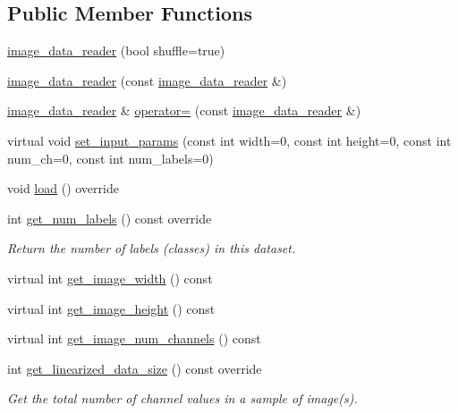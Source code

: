 \subsection*{Public Member Functions}
\begin{DoxyCompactItemize}
\item 
\hyperlink{classlbann_1_1image__data__reader_a582185ab03c4643117fd93e0ba843882}{image\+\_\+data\+\_\+reader} (bool shuffle=true)
\item 
\hyperlink{classlbann_1_1image__data__reader_a7a5dd69d535f2966e4f8da53f505ca7c}{image\+\_\+data\+\_\+reader} (const \hyperlink{classlbann_1_1image__data__reader}{image\+\_\+data\+\_\+reader} \&)
\item 
\hyperlink{classlbann_1_1image__data__reader}{image\+\_\+data\+\_\+reader} \& \hyperlink{classlbann_1_1image__data__reader_a76a0b52eafb9ad133fb45fec7cf44700}{operator=} (const \hyperlink{classlbann_1_1image__data__reader}{image\+\_\+data\+\_\+reader} \&)
\item 
virtual void \hyperlink{classlbann_1_1image__data__reader_a6ed9b8b12ad3ffa93ad458d872f8c044}{set\+\_\+input\+\_\+params} (const int width=0, const int height=0, const int num\+\_\+ch=0, const int num\+\_\+labels=0)
\item 
void \hyperlink{classlbann_1_1image__data__reader_a99cb80242d7d20bc1e8baeaff25ff790}{load} () override
\item 
int \hyperlink{classlbann_1_1image__data__reader_af821795e5104f1a8c34027de96af7b90}{get\+\_\+num\+\_\+labels} () const override
\begin{DoxyCompactList}\small\item\em Return the number of labels (classes) in this dataset. \end{DoxyCompactList}\item 
virtual int \hyperlink{classlbann_1_1image__data__reader_a2e75d4ec8f222f4f855e6c0162648dc7}{get\+\_\+image\+\_\+width} () const
\item 
virtual int \hyperlink{classlbann_1_1image__data__reader_a641364038b54fe8291f23f9d879293e3}{get\+\_\+image\+\_\+height} () const
\item 
virtual int \hyperlink{classlbann_1_1image__data__reader_a3699aa92d3ef2ccc0c30ecf27809acbe}{get\+\_\+image\+\_\+num\+\_\+channels} () const
\item 
int \hyperlink{classlbann_1_1image__data__reader_a26b8566e76ba99c017a84c49a9dec37c}{get\+\_\+linearized\+\_\+data\+\_\+size} () const override
\begin{DoxyCompactList}\small\item\em Get the total number of channel values in a sample of image(s). \end{DoxyCompactList}\item 

\end{DoxyCompactItemize}
